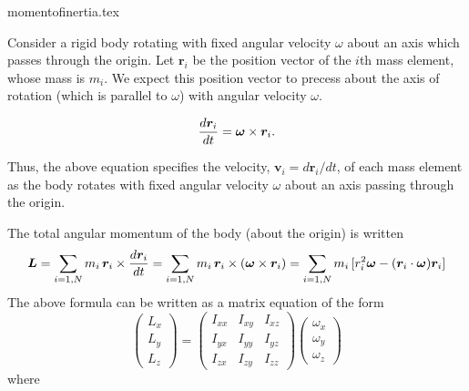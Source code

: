 \begin{flushright} {\tiny {\color{gray} momentofinertia.tex}} \end{flushright}


Consider a rigid body rotating with fixed angular velocity $\omega$ about an axis which passes through the origin.
Let ${\bm r}_i$ be the position vector of the $i$th mass element, whose 
mass is $m_i$. We expect this position vector to precess about the axis of rotation (which is parallel to $\omega$) 
with angular velocity $\omega$. 

\begin{displaymath} 
\frac{d{\bm r}_i}{dt} = \mbox{\boldmath$\omega$}\times {\bm r}_i. 
\end{displaymath}

Thus, the above equation specifies the velocity, ${\bm v}_i = d{\bm r}_i/dt$, of each mass element as the body rotates with fixed angular velocity $\omega$ about an axis passing through the origin. 


The total angular momentum of the body (about the origin) is written
\begin{displaymath} 
{\bm L} 
= \sum_{i=1,N} m_i\,{\bm r}_i\times\frac{d{\bm r}_i}{dt}
= \sum_{i=1,N} m_i\,{\bm r}_i\times ( \mbox{\boldmath$\omega$}\times {\bm r}_i )
= \sum_{i=1,N} m_i\, [ r_i^2 {\bm \omega} - ({\bm r}_i\cdot {\bm \omega}) {\bm r}_i ]
\end{displaymath}
The above formula can be written as a matrix equation of the form
\begin{displaymath} 
\left(\begin{array}{c}L_x\\ L_y\\ L_z\end{array}\right)=
\left(\begin{array}{ccc}
I_{xx} & I_{xy} & I_{xz} \\
I_{yx} & I_{yy} & I_{yz} \\
I_{zx} & I_{zy} & I_{zz} 
\end{array}\right) 
\left(\begin{array}{c}\omega_x\\ \omega_y\\ \omega_z\end{array}\right)
\end{displaymath}
where

